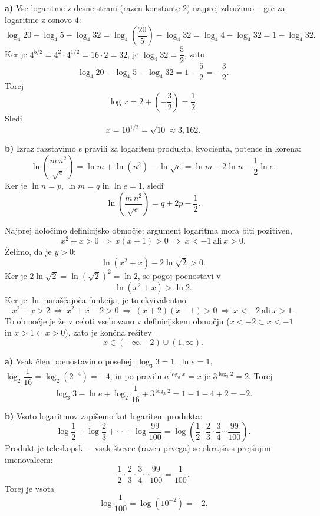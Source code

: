 \documentclass[a4paper,12pt]{letter}
\begin{document}
\begin{resitev}
\textbf{a)} Vse logaritme z desne strani (razen konstante $2$) najprej zdru\v{z}imo -- gre za logaritme z osnovo $4$:
\[
\log_4 20-\log_4 5-\log_4 32=\log_4\!\left(\frac{20}{5}\right)-\log_4 32=\log_4 4-\log_4 32=1-\log_4 32.
\]
Ker je $4^{5/2}=4^2\cdot4^{1/2}=16\cdot2=32$, je $\log_4 32=\dfrac52$, zato
\[
\log_4 20-\log_4 5-\log_4 32=1-\frac52=-\frac32.
\]
Torej
\[
\log x=2+\left(-\frac32\right)=\frac12.
\]
Sledi
\[
x=10^{1/2}=\sqrt{10}\approx3{,}162.
\]

\textbf{b)} Izraz razstavimo s pravili za logaritem produkta, kvocienta, potence in korena:
\[
\ln\!\left(\frac{m\,n^2}{\sqrt e}\right)=\ln m+\ln\!\left(n^2\right)-\ln\sqrt e=\ln m+2\ln n-\frac12\ln e.
\]
Ker je $\ln n=p$, $\ln m=q$ in $\ln e=1$, sledi
\[
\ln\!\left(\frac{m\,n^2}{\sqrt e}\right)=q+2p-\frac12.
\]
\end{resitev}
\newpage

\begin{resitev}
Najprej dolo\v{c}imo definicijsko obmo\v{c}je: argument logaritma mora biti pozitiven,
\[
x^2+x>0\ \Longrightarrow\ x(x+1)>0\ \Longrightarrow\ x<-1\ \text{ali}\ x>0.
\]
\v{Z}elimo, da je $y>0$:
\[
\ln\!\left(x^2+x\right)-2\ln\sqrt2>0.
\]
Ker je $2\ln\sqrt2=\ln\!\left(\sqrt2\right)^2=\ln2$, se pogoj poenostavi v
\[
\ln\!\left(x^2+x\right)>\ln2.
\]
Ker je $\ln$ nara\v{s}\v{c}ajo\v{c}a funkcija, je to ekvivalentno
\[
x^2+x>2\ \Longrightarrow\ x^2+x-2>0\ \Longrightarrow\ (x+2)(x-1)>0\ \Longrightarrow\ x<-2\ \text{ali}\ x>1.
\]
To obmo\v{c}je je \v{z}e v celoti vsebovano v definicijskem obmo\v{c}ju ($x<-2\subset x<-1$ in $x>1\subset x>0$), zato je kon\v{c}na re\v{s}itev
\[
x\in(-\infty,-2)\cup(1,\infty).
\]
\end{resitev}
\newpage
\begin{resitev}
\textbf{a)} Vsak \v{c}len poenostavimo posebej: $\log_3 3=1$, $\ln e=1$, $\log_2\dfrac{1}{16}=\log_2\!\left(2^{-4}\right)=-4$, in po pravilu $a^{\log_a x}=x$ je $3^{\log_3 2}=2$. Torej
\[
\log_3 3-\ln e+\log_2\frac{1}{16}+3^{\log_3 2}=1-1-4+2=-2.
\]

\textbf{b)} Vsoto logaritmov zapi\v{s}emo kot logaritem produkta:
\[
\log\frac12+\log\frac23+\cdots+\log\frac{99}{100}=\log\!\left(\frac12\cdot\frac23\cdot\frac34\cdots\frac{99}{100}\right).
\]
Produkt je teleskopski -- vsak \v{s}tevec (razen prvega) se okraj\v{s}a s prej\v{s}njim imenovalcem:
\[
\frac12\cdot\frac23\cdot\frac34\cdots\frac{99}{100}=\frac{1}{100}.
\]
Torej je vsota
\[
\log\frac{1}{100}=\log\!\left(10^{-2}\right)=-2.
\]
\end{resitev}
\end{document}
